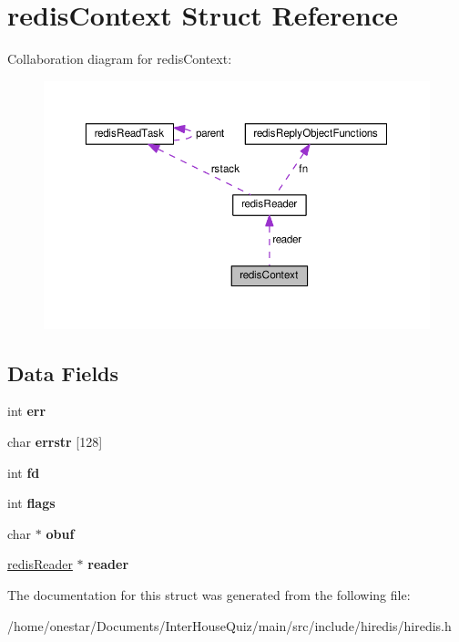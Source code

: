 \hypertarget{structredis_context}{\section{redis\+Context Struct Reference}
\label{structredis_context}
}


Collaboration diagram for redis\+Context\+:\nopagebreak
\begin{figure}[H]
\begin{center}
\leavevmode
\includegraphics[width=350pt]{structredis_context__coll__graph}
\end{center}
\end{figure}
\subsection*{Data Fields}
\begin{DoxyCompactItemize}
\item 
\hypertarget{structredis_context_a6ce68847c12434f60d1b2654a3dc3409}{int {\bfseries err}}\label{structredis_context_a6ce68847c12434f60d1b2654a3dc3409}

\item 
\hypertarget{structredis_context_a653f7a6c1a0a77bb6917d6362aca8192}{char {\bfseries errstr} \mbox{[}128\mbox{]}}\label{structredis_context_a653f7a6c1a0a77bb6917d6362aca8192}

\item 
\hypertarget{structredis_context_a6f8059414f0228f0256115e024eeed4b}{int {\bfseries fd}}\label{structredis_context_a6f8059414f0228f0256115e024eeed4b}

\item 
\hypertarget{structredis_context_ac8bf36fe0577cba66bccda3a6f7e80a4}{int {\bfseries flags}}\label{structredis_context_ac8bf36fe0577cba66bccda3a6f7e80a4}

\item 
\hypertarget{structredis_context_a8e8cd706bf57dc95bde9af872d3e8717}{char $\ast$ {\bfseries obuf}}\label{structredis_context_a8e8cd706bf57dc95bde9af872d3e8717}

\item 
\hypertarget{structredis_context_ae998bd9c6dd37c676de386297c05cfa7}{\hyperlink{structredis_reader}{redis\+Reader} $\ast$ {\bfseries reader}}\label{structredis_context_ae998bd9c6dd37c676de386297c05cfa7}

\end{DoxyCompactItemize}


The documentation for this struct was generated from the following file\+:\begin{DoxyCompactItemize}
\item 
/home/onestar/\+Documents/\+Inter\+House\+Quiz/main/src/include/hiredis/hiredis.\+h\end{DoxyCompactItemize}
